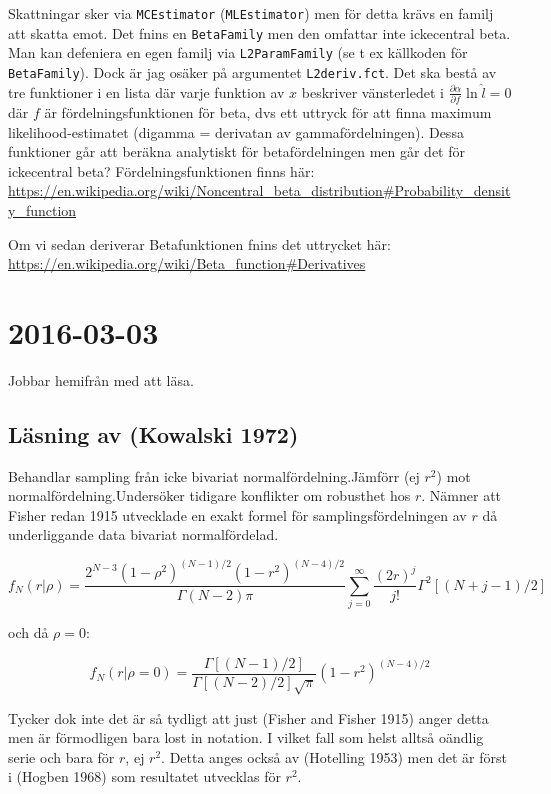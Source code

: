 \documentclass[]{article}
\begin{document}
Skattningar sker via \texttt{MCEstimator} (\texttt{MLEstimator}) men för
detta krävs en familj att skatta emot. Det fnins en \texttt{BetaFamily}
men den omfattar inte ickecentral beta. Man kan defeniera en egen familj
via \texttt{L2ParamFamily} (se t ex källkoden för \texttt{BetaFamily}).
Dock är jag osäker på argumentet \texttt{L2deriv.fct}. Det ska bestå av
tre funktioner i en lista där varje funktion av \(x\) beskriver
vänsterledet i \(\frac{\partial \alpha}{\partial f} \ln{\hat{l}} = 0\)
där \(f\) är fördelningsfunktionen för beta, dvs ett uttryck för att
finna maximum likelihood-estimatet (digamma = derivatan av
gammafördelningen). Dessa funktioner går att beräkna analytiskt för
betafördelningen men går det för ickecentral beta? Fördelningsfunktionen
finns här:
\url{https://en.wikipedia.org/wiki/Noncentral_beta_distribution\#Probability_density_function}

Om vi sedan deriverar Betafunktionen fnins det uttrycket här:
\url{https://en.wikipedia.org/wiki/Beta_function\#Derivatives}

\section{2016-03-03}\label{section-3}

Jobbar hemifrån med att läsa.

\subsection{Läsning av (Kowalski 1972)}\label{lasning-av-kowalski1972}

Behandlar sampling från icke bivariat normalfördelning.Jämförr (ej
\(r^2\)) mot normalfördelning.Undersöker tidigare konflikter om
robusthet hos \(r\). Nämner att Fisher redan 1915 utvecklade en exakt
formel för samplingsfördelningen av \(r\) då underliggande data bivariat
normalfördelad.

\[f_N(r|\rho) = \frac{2^{N-3}(1-\rho^2)^{(N-1)/2}(1-r^2)^{(N-4)/2}}{\Gamma(N-2)\pi} \sum_{j = 0}^\infty \frac{(2r)^j}{j!}\Gamma^2[(N+j-1)/2]\]

och då \(\rho = 0\):

\[f_N(r|\rho=0) = \frac{\Gamma[(N-1)/2]}{\Gamma[(N-2)/2]\sqrt{\pi}}(1-r^2)^{(N-4)/2} \]

Tycker dok inte det är så tydligt att just (Fisher and Fisher 1915)
anger detta men är förmodligen bara lost in notation. I vilket fall som
helst alltså oändlig serie och bara för \(r\), ej \(r^2\). Detta anges
också av (Hotelling 1953) men det är först i (Hogben 1968) som
resultatet utvecklas för \(r^2\).
\end{document}
